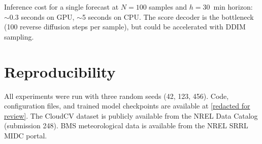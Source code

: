 \documentclass{article}
\begin{document}
Inference cost for a single forecast at $N=100$ samples and $h=30$~min horizon: $\sim$0.3 seconds on GPU, $\sim$5 seconds on CPU. The score decoder is the bottleneck (100 reverse diffusion steps per sample), but could be accelerated with DDIM sampling.

\section{Reproducibility}
\label{app:reproducibility}

All experiments were run with three random seeds (42, 123, 456). Code, configuration files, and trained model checkpoints are available at \url{[redacted for review]}. The CloudCV dataset is publicly available from the NREL Data Catalog (submission 248). BMS meteorological data is available from the NREL SRRL MIDC portal.
\end{document}
